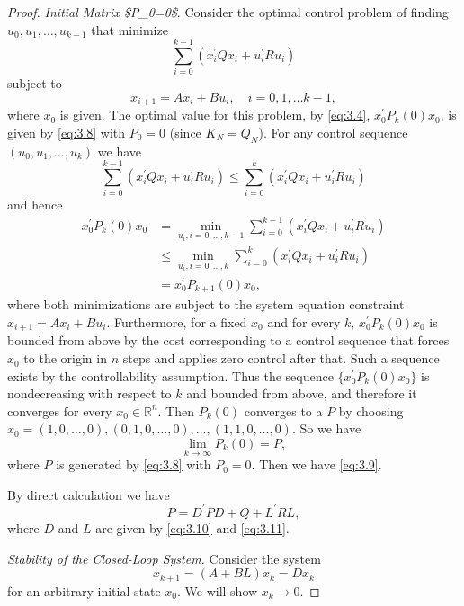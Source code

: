 \begin{proof}
\textit{Initial Matrix \$P\_0=0\$}. 
    Consider the optimal control problem of finding $u_0,u_1,\dots,u_{k-1}$ that minimize
    \[\sum_{i=0}^{k-1} (x_i^\prime Q x_i + u_i^\prime R u_i)\]
    subject to \[x_{i + 1} = Ax_i + Bu_i,\quad i = 0,1,\dots k - 1,\]
    where $x_0$ is given. The optimal value for this problem, by \cref{eq:3.4}, $x_0^\prime P_k(0) x_0$, is given by \cref{eq:3.8} with $P_0=0 $ (since $K_N=Q_N$). 
    For any control sequence ${(u_0,u_1,\dots,u_{k})} $ we have 
    \[\sum_{i=0}^{k-1} (x_i^\prime Q x_i + u_i^\prime R u_i)\leq \sum_{i=0}^{k} (x_i^\prime Q x_i + u_i^\prime R u_i)\]
    and hence 
    \[\begin{aligned}
        x_0^\prime P_k(0) x_0 &=\min_{u_i,i = 0,\dots,k - 1}\sum_{i=0}^{k-1} (x_i^{\prime} Q x_i + u_i^{\prime} R u_i)\\
            &\leq \min_{u_i,i = 0,\dots,k}\sum_{i=0}^{k}
            (x_i^{\prime} Q x_i + u_i^{\prime} R u_i)\\
            &= x_0^\prime P_{k + 1}(0)x_0,
    \end{aligned}\]
    where both minimizations are subject to the system equation constraint $x_{i+1}=A x_i+B u_i$. Furthermore, for a fixed $x_0$ and for every $k$, $x_0^{\prime} P_k(0) x_0$ is bounded from above by the cost corresponding to a control sequence that forces $x_0$ to the origin in $n$ steps and applies zero control after that. Such a sequence exists by the controllability assumption. Thus the sequence $\{x_0^{\prime} P_k(0) x_0\}$ is nondecreasing with respect to $k$ and bounded from above, and therefore it converges for every $x_0\in\mathbb{R}^n$. Then $P_k(0)$ converges to a $P$ by choosing $x_0=(1,0,\dots,0), (0,1,0,\dots,0),\dots,(1,1,0,\dots,0)$. So we have \[\lim_{k\rightarrow\infty}P_k(0) = P,\]
    where $P$ is generated by \cref{eq:3.8} with $P_0=0$. Then we have \cref{eq:3.9}. 

    By direct calculation we have 
    \begin{equation}
        P = D^\prime P D + Q + L^\prime R L,
    \end{equation}
    where $D$ and $L$ are given by \cref{eq:3.10} and \cref{eq:3.11}. 

\textit{Stability of the Closed-Loop System.}
    Consider the system \begin{equation}\label{eq:3.15}
        x_{k + 1} =(A + BL)x_k = D x_k
    \end{equation}
    for an arbitrary initial state $x_0$. We will show $x_k\rightarrow 0$. 








\end{proof}
